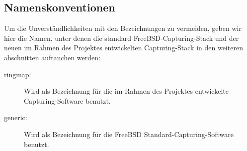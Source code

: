 \subsection{Namenskonventionen}
Um die Unverständlichkeiten mit den Bezeichnungen zu vermeiden, geben wir 
hier die Namen, unter denen die standard FreeBSD-Capturing-Stack und 
der neuen im Rahmen des Projektes entwickelten Capturing-Stack in den 
weiteren abschnitten auftauchen werden: 
\begin{description}
	\item[ringmap:] Wird als Bezeichnung für die im Rahmen des Projektes 
		entwickelte Capturing-Software benutzt. 
	\item [generic:] Wird als Bezeichnung für die FreeBSD Standard-Capturing-Software benutzt.
\end{description}

